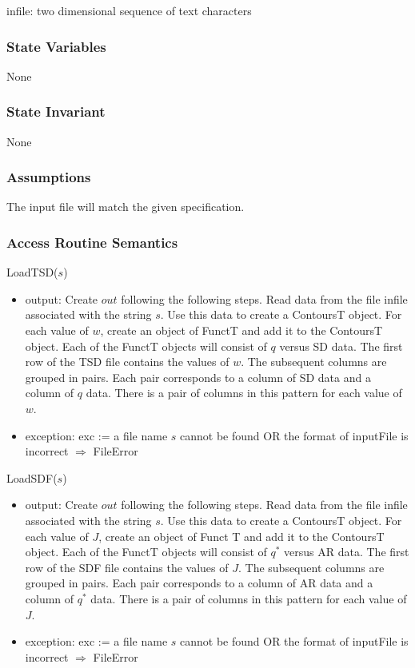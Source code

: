 \documentclass[12pt, titlepage]{article}
\begin{document}
infile: two dimensional sequence of text characters

\subsubsection {State Variables}

None

\subsubsection {State Invariant}

None

\subsubsection {Assumptions}

The input file will match the given specification.

\subsubsection {Access Routine Semantics}

\noindent LoadTSD($s$)
\begin{itemize}
\item output: Create $out$ following the following steps.  Read data from the
  file infile associated with the string $s$.  Use this data to create a ContoursT
  object.  For each value of $w$, create an object of FunctT and add it to the
  ContoursT object.  Each of the FunctT objects will consist of $q$ versus SD
  data.  The first row of the TSD file contains the values of $w$.  The
  subsequent columns are grouped in pairs.  Each pair corresponds to a column of
  SD data and a column of $q$ data.  There is a pair of columns in this pattern
  for each value of $w$.\\

\item exception: exc := a file name $s$ cannot be found OR the format of
  inputFile is incorrect $\Rightarrow$  FileError
\end{itemize}

\noindent LoadSDF($s$)
\begin{itemize}
\item output: Create $out$ following the following steps.  Read data from the
  file infile associated with the string $s$.  Use this data to create a ContoursT
  object.  For each value of $J$, create an object of Funct T and add it to the
  ContoursT object.  Each of the FunctT objects will consist of $q^*$ versus AR
  data.  The first row of the SDF file contains the values of $J$.  The
  subsequent columns are grouped in pairs.  Each pair corresponds to a column of
  AR data and a column of $q^*$ data.  There
  is a pair of columns in this pattern for each value of $J$.\\
\item exception: exc := a file name $s$ cannot be found OR the format of
  inputFile is incorrect $\Rightarrow$  FileError
\end{itemize}
\end{document}
